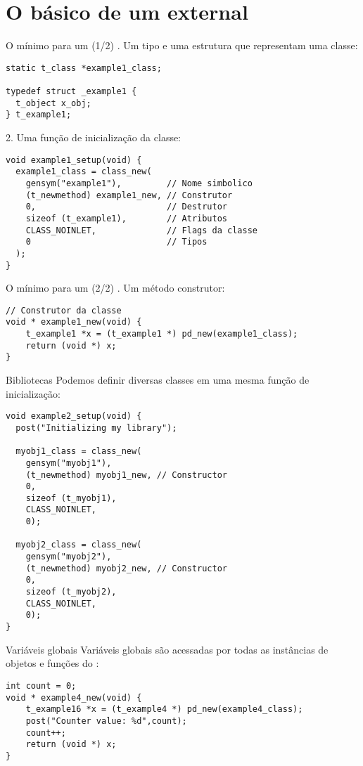 \section{O básico de um external}


\begin{frame}[fragile]{O mínimo para um \external (1/2)}
. Um tipo e uma estrutura que representam uma classe: 
\begin{lstlisting}
static t_class *example1_class;

typedef struct _example1 {
  t_object x_obj;
} t_example1;
\end{lstlisting}
2. Uma função de inicialização da classe:
\begin{lstlisting}
void example1_setup(void) {
  example1_class = class_new(
    gensym("example1"),         // Nome simbolico
    (t_newmethod) example1_new, // Construtor
    0,                          // Destrutor
    sizeof (t_example1),        // Atributos
    CLASS_NOINLET,              // Flags da classe
    0                           // Tipos
  );
}
\end{lstlisting}
\end{frame}


\begin{frame}[fragile]{O mínimo para um \external (2/2)}
. Um método construtor:
\begin{lstlisting}
// Construtor da classe
void * example1_new(void) {
    t_example1 *x = (t_example1 *) pd_new(example1_class);
    return (void *) x;
}
\end{lstlisting}
\end{frame}


\begin{frame}[fragile]{Bibliotecas}
Podemos definir diversas classes em uma mesma função de inicialização:
\begin{lstlisting}
void example2_setup(void) {
  post("Initializing my library");

  myobj1_class = class_new(
    gensym("myobj1"),
    (t_newmethod) myobj1_new, // Constructor
    0,
    sizeof (t_myobj1),
    CLASS_NOINLET,
    0);

  myobj2_class = class_new(
    gensym("myobj2"),
    (t_newmethod) myobj2_new, // Constructor
    0,
    sizeof (t_myobj2),
    CLASS_NOINLET,
    0);
}
\end{lstlisting}
\end{frame}


\begin{frame}[fragile]{Variáveis globais}
Variáveis globais são acessadas por todas as instâncias de objetos e funções
do \external:
\begin{lstlisting}
int count = 0;
void * example4_new(void) {
    t_example16 *x = (t_example4 *) pd_new(example4_class);
    post("Counter value: %d",count);
    count++;
    return (void *) x;
}
\end{lstlisting}
\end{frame}


